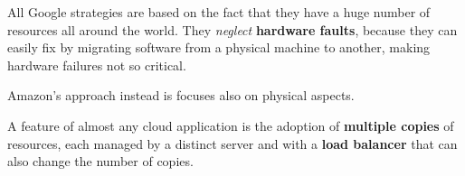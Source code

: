 All Google strategies are based on the fact that they have a huge number of resources all around the world.
They \textit{neglect} \textbf{hardware faults},
because they can easily fix by migrating software from a physical machine to another,
making hardware failures not so critical.

Amazon's approach instead is focuses also on physical aspects.

A feature of almost any cloud application is the adoption of \textbf{multiple copies} of resources, each managed by a distinct server and with a \textbf{load balancer} that can also change the number of copies.

